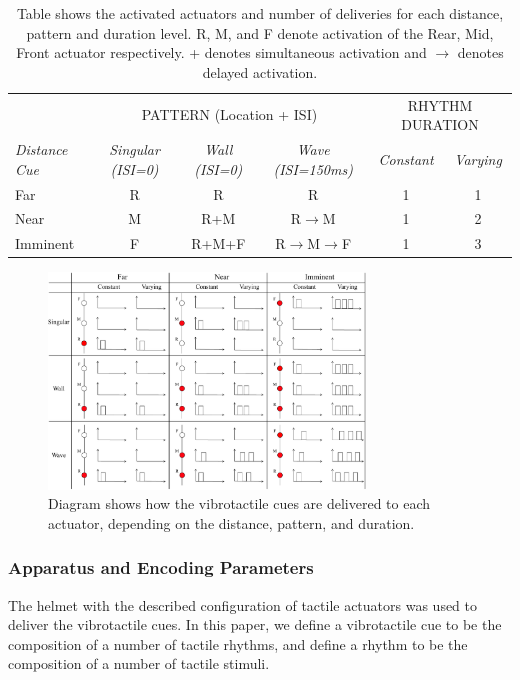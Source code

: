 \documentclass{mpaper}
\begin{document}
\begin{table}[h]
    \centering
    \begin{tabular}{l||c|c|c||c|c}
        & \multicolumn{3}{c||}{PATTERN (Location + ISI)} & \multicolumn{2}{c}{RHYTHM DURATION}\\ \cline{2-6} 
        \emph{Distance Cue} & \emph{Singular (ISI=0)} & \emph{Wall (ISI=0)} & \emph{Wave (ISI=150ms)} & \emph{Constant} & \emph{Varying} \\ \hline
        Far & R & R & R & 1 & 1\\ 
        Near & M & R+M & R$\rightarrow$M & 1 & 2\\ 
        Imminent & F & R+M+F & R$\rightarrow$M$\rightarrow$F & 1 & 3\\ 
    \end{tabular}
    \caption{Table shows the activated actuators and number of deliveries for each distance, pattern and duration level. R, M, and F denote activation of the Rear, Mid, Front actuator respectively. + denotes simultaneous activation and $\rightarrow$ denotes delayed activation.}
    \label{tab:location}
\end{table}

\begin{figure}[h]
    \centering
    \includegraphics[width=0.75\textwidth]{images/cue-table.pdf}
    \caption{Diagram shows how the vibrotactile cues are delivered to each actuator, depending on the distance, pattern, and duration.}
    \label{fig:cue-table}
\end{figure}



\subsubsection{Apparatus and Encoding Parameters}\label{sec:apparatus}
The helmet with the described configuration of tactile actuators was used to deliver the vibrotactile cues. In this paper, we define a vibrotactile cue to be the composition of a number of tactile rhythms, and define a rhythm to be the composition of a number of tactile stimuli.
\end{document}

